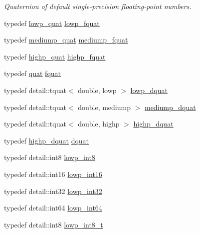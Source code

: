 \begin{CompactItemize}
\begin{CompactList}\small\item\em Quaternion of default single-precision floating-point numbers. \item\end{CompactList}\item 
typedef \hyperlink{namespaceglm_efc1d896fa40939955d68b2c68c33cc8}{lowp\_\-quat} \hyperlink{namespaceglm_ad1f5b3c348c223fb36e28f646552cff}{lowp\_\-fquat}
\item 
typedef \hyperlink{namespaceglm_a891775f83d9da605b5dd0dc34a3ef62}{mediump\_\-quat} \hyperlink{namespaceglm_154ae157e20a677e5663d97b923b1053}{mediump\_\-fquat}
\item 
typedef \hyperlink{namespaceglm_8d2836172e6561f6519c39d0b5d025c1}{highp\_\-quat} \hyperlink{namespaceglm_d1acf6af4ae4af94dfec8814b058d5eb}{highp\_\-fquat}
\item 
typedef \hyperlink{namespaceglm_c1f6a5957091b849730ea6f05a6b7ad6}{quat} \hyperlink{group__gtc__type__precision_ga95d73f08018f3864c6ae08dbf1c59f2}{fquat}
\item 
typedef detail::tquat$<$ double, lowp $>$ \hyperlink{namespaceglm_d5f207f07b36f4ebd98338c21b92062e}{lowp\_\-dquat}
\item 
typedef detail::tquat$<$ double, mediump $>$ \hyperlink{namespaceglm_302e27293c89ef6128f4eb14ea06ec8b}{mediump\_\-dquat}
\item 
typedef detail::tquat$<$ double, highp $>$ \hyperlink{namespaceglm_6504747f6a2ec4a369a51244fcabc61e}{highp\_\-dquat}
\item 
typedef \hyperlink{namespaceglm_6504747f6a2ec4a369a51244fcabc61e}{highp\_\-dquat} \hyperlink{namespaceglm_49693161673a003b4a8fd4d8b15b0b7b}{dquat}
\item 
typedef detail::int8 \hyperlink{group__gtc__type__precision_gf9e675b6392764242ae87eb179e9d3d6}{lowp\_\-int8}
\item 
typedef detail::int16 \hyperlink{group__gtc__type__precision_g71fc0c399fa4780507748b643733f153}{lowp\_\-int16}
\item 
typedef detail::int32 \hyperlink{group__gtc__type__precision_gd9939c9d6fec1c6accc02a83c6500f08}{lowp\_\-int32}
\item 
typedef detail::int64 \hyperlink{group__gtc__type__precision_gb8a8e75af347592406e41b3ae2c0712b}{lowp\_\-int64}
\item 
typedef detail::int8 \hyperlink{group__gtc__type__precision_ge6092311f6970a305c2df19a372360a3}{lowp\_\-int8\_\-t}
\item 

\end{CompactItemize}
